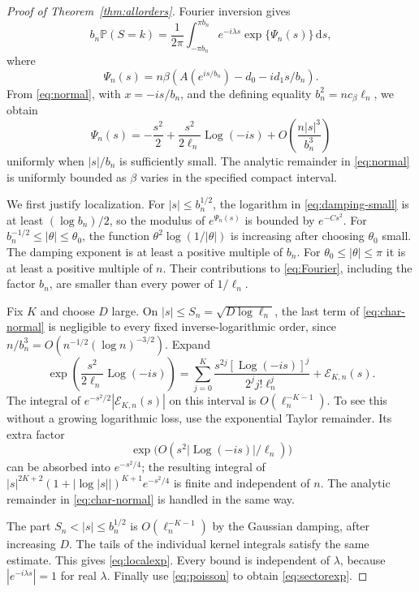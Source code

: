 \documentclass[11pt,a4paper]{article}
\numberwithin{equation}{section}
\theoremstyle{definition}
\theoremstyle{remark}
\DeclareMathOperator{\Log}{Log}
\newcommand{\Prob}{\mathbb P}
\newcommand{\dd}{\,\mathrm d}
\begin{document}
\begin{proof}[Proof of Theorem~\ref{thm:allorders}]
Fourier inversion gives
\begin{equation}\label{eq:Fourier}
 b_n\Prob(S=k)=\frac1{2\pi}
 \int_{-\pi b_n}^{\pi b_n}
 e^{-i\lambda s}\exp\{\Psi_n(s)\}\dd s,
\end{equation}
where
\[
 \Psi_n(s)=n\beta\left(A(e^{is/b_n})-d_0-i d_1s/b_n\right).
\]
From \eqref{eq:normal}, with $x=-is/b_n$, and the defining equality
$b_n^2=n c_\beta\ell_n$, we obtain
\begin{equation}\label{eq:char-normal}
 \Psi_n(s)=-\frac{s^2}{2}
   +\frac{s^2}{2\ell_n}\Log(-is)
   +O\left(\frac{n|s|^3}{b_n^3}\right)
\end{equation}
uniformly when $|s|/b_n$ is sufficiently small. The analytic remainder
in \eqref{eq:normal} is uniformly bounded as $\beta$ varies in the
specified compact interval.

We first justify localization. For $|s|\le b_n^{1/2}$, the logarithm in
\eqref{eq:damping-small} is at least $(\log b_n)/2$, so the modulus of
$e^{\Psi_n(s)}$ is bounded by $e^{-C s^2}$. For
$b_n^{-1/2}\le|\theta|\le\theta_0$, the function
$\theta^2\log(1/|\theta|)$ is increasing after choosing
$\theta_0$ small. The damping exponent is at least a positive multiple
of $b_n$. For $\theta_0\le|\theta|\le\pi$ it is at least a positive
multiple of $n$. Their contributions to \eqref{eq:Fourier}, including
the factor $b_n$, are smaller than every power of $1/\ell_n$.

Fix $K$ and choose $D$ large. On
$|s|\le S_n=\sqrt{D\log\ell_n}$, the last term of
\eqref{eq:char-normal} is negligible to every fixed inverse-logarithmic
order, since $n/b_n^3=O(n^{-1/2}(\log n)^{-3/2})$.
Expand
\[
 \exp\left(\frac{s^2}{2\ell_n}\Log(-is)\right)
 =\sum_{j=0}^K\frac{s^{2j}[\Log(-is)]^j}
 {2^j j!\ell_n^j}+\mathcal E_{K,n}(s).
\]
The integral of $e^{-s^2/2}|\mathcal E_{K,n}(s)|$ on this interval is
$O(\ell_n^{-K-1})$. To see this without a growing logarithmic loss,
use the exponential Taylor remainder. Its extra factor
\[
 \exp\bigl(O(s^2|\Log(-is)|/\ell_n)\bigr)
\]
can be absorbed into $e^{-s^2/4}$; the resulting integral of $|s|^{2K+2}(1+|\log|s||)^{K+1}e^{-s^2/4}$ is finite
and independent of $n$. The analytic remainder in
\eqref{eq:char-normal} is handled in the same way.

The part $S_n<|s|\le b_n^{1/2}$ is $O(\ell_n^{-K-1})$ by the
Gaussian damping, after increasing $D$. The tails of the individual
kernel integrals satisfy the same estimate. This gives
\eqref{eq:localexp}. Every bound is independent of $\lambda$, because
$|e^{-i\lambda s}|=1$ for real $\lambda$. Finally use
\eqref{eq:poisson} to obtain \eqref{eq:sectorexp}.
\end{proof}
\end{document}
